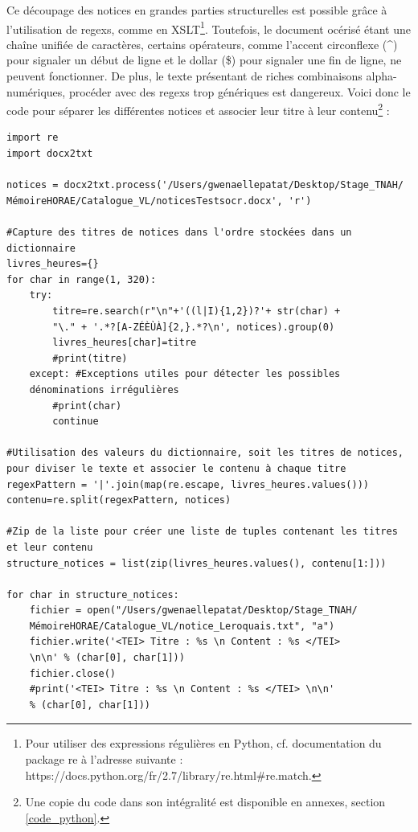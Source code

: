 \documentclass[a4paper,12pt,twoside]{book}
\begin{document}
Ce découpage des notices en grandes parties structurelles est possible grâce à l'utilisation de regexs, comme en XSLT\footnote{Pour utiliser des expressions régulières en Python, cf. documentation du package re à l'adresse suivante : https://docs.python.org/fr/2.7/library/re.html#re.match.}. Toutefois, le document océrisé étant une chaîne unifiée de caractères, certains opérateurs, comme l'accent circonflexe (\og \^\fg{}) pour signaler un début de ligne et le dollar (\og \$\fg{}) pour signaler une fin de ligne, ne peuvent fonctionner. De plus, le texte présentant de riches combinaisons alpha-numériques, procéder avec des regexs trop génériques est dangereux. Voici donc le code pour séparer les différentes notices et associer leur titre à leur contenu\footnote{Une copie du code dans son intégralité est disponible en annexes, section \ref{code_python}.} : 
\begin{verbatim}
import re
import docx2txt

notices = docx2txt.process('/Users/gwenaellepatat/Desktop/Stage_TNAH/
MémoireHORAE/Catalogue_VL/noticesTestsocr.docx', 'r')
 
#Capture des titres de notices dans l'ordre stockées dans un dictionnaire
livres_heures={}
for char in range(1, 320):
    try:
        titre=re.search(r"\n"+'((l|I){1,2})?'+ str(char) + 
        "\." + '.*?[A-ZÉÈÙÀ]{2,}.*?\n', notices).group(0)
        livres_heures[char]=titre
        #print(titre)
    except: #Exceptions utiles pour détecter les possibles 
    dénominations irrégulières
        #print(char)
        continue
        
#Utilisation des valeurs du dictionnaire, soit les titres de notices, 
pour diviser le texte et associer le contenu à chaque titre
regexPattern = '|'.join(map(re.escape, livres_heures.values()))
contenu=re.split(regexPattern, notices)
 
#Zip de la liste pour créer une liste de tuples contenant les titres 
et leur contenu
structure_notices = list(zip(livres_heures.values(), contenu[1:]))
 
for char in structure_notices:
    fichier = open("/Users/gwenaellepatat/Desktop/Stage_TNAH/
    MémoireHORAE/Catalogue_VL/notice_Leroquais.txt", "a")
    fichier.write('<TEI> Titre : %s \n Content : %s </TEI> 
    \n\n' % (char[0], char[1]))
    fichier.close()
    #print('<TEI> Titre : %s \n Content : %s </TEI> \n\n' 
    % (char[0], char[1]))
\end{verbatim}
\end{document}
